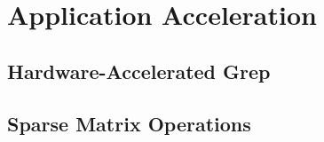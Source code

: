 \section{Application Acceleration}
\subsection{Hardware-Accelerated Grep}

\subsection{Sparse Matrix Operations}
